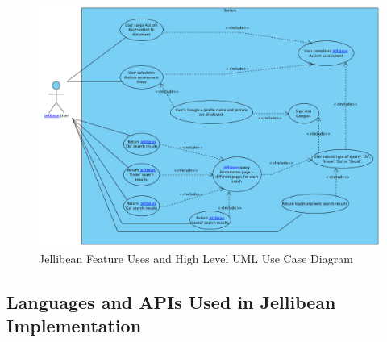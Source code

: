 \documentclass[a4paper, 11pt]{article}
\begin{document}
\begin{figure}[H]
\begin{center}
\includegraphics[scale=0.40]{JBeanUseCase}
\caption{Jellibean Feature Uses and High Level UML Use Case Diagram}
\label{JBeanUseCase}
\end{center}
\end{figure}


\newpage

\subsection{Languages and APIs Used in Jellibean Implementation}\label{implementation}
\end{document}
